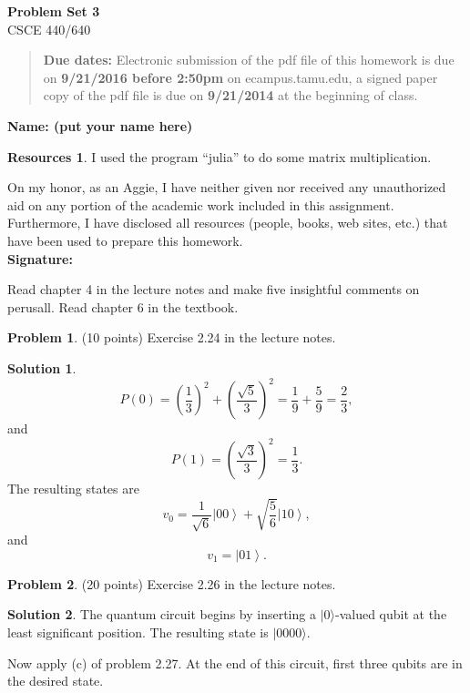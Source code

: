 \documentclass{article}
\theoremstyle{definition}
\newtheorem{problem}{Problem}
\newtheorem*{solution}{Solution}
\newtheorem*{resources}{Resources}
\newcommand{\ket}[1]{|#1\rangle}
\newcommand{\name}[1]{\noindent\textbf{Name: #1}}
\newcommand{\honor}{\noindent On my honor, as an Aggie, I have neither
  given nor received any unauthorized aid on any portion of the
  academic work included in this assignment. Furthermore, I have
  disclosed all resources (people, books, web sites, etc.) that have
  been used to prepare this homework. \\[1ex]
 \textbf{Signature:} \underline{\hspace*{5cm}} }
\newcommand{\problemset}[1]{\begin{center}\textbf{Problem Set #1}\\ 
CSCE 440/640\end{center}}
\newcommand{\duedate}[2]{\begin{quote}\textbf{Due dates:} Electronic
    submission of the pdf file of this homework is due on \textbf{#1} on ecampus.tamu.edu, a signed paper copy
    of the pdf file is due on \textbf{#2} at the beginning of
    class. \end{quote} }
\begin{document}
\problemset{3}
\duedate{9/21/2016 before 2:50pm}{9/21/2014}
\name{ (put your name here)}
\begin{resources} I used the program ``julia'' to do some matrix multiplication.
\end{resources}
\honor

\newpage

\noindent Read chapter 4 in the lecture notes and make five insightful
comments on perusall. Read chapter 6 in the textbook. \medskip


\begin{problem}(10 points) 
Exercise 2.24 in the lecture notes. 
\end{problem}
\begin{solution}
$$P(0) = \left(\frac{1}{3}\right)^2 + \left(\frac{\sqrt 5}{3}\right)^2 =  \frac{1}{9} + \frac{5}{9} = \frac{2}{3},$$
and
$$P(1) = \left(\frac{\sqrt 3}{3}\right)^2 = \frac{1}{3}.$$
The resulting states are
$$v_0 = \frac{1}{\sqrt 6} \left| 00 \right\rangle + \sqrt{\frac{5}{6}} \left| 10 \right\rangle,$$
and
$$v_1 = \left| 01 \right\rangle.$$
\end{solution}

\begin{problem}(20 points) 
Exercise 2.26 in the lecture notes. 
\end{problem}
\begin{solution}
The quantum circuit begins by inserting a $\ket{0}$-valued qubit at the least significant position.
The resulting state is $\ket{0000}$.

Now apply (c) of problem 2.27.  At the end of this circuit, first three qubits are in the desired state.

\end{solution}
\end{document}
